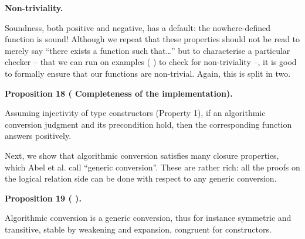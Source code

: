  
 
 
\par\medskip\noindent\textbf{Non-triviality.}\par
 
 
Soundness, both positive and negative, has a default: the nowhere-defined function is sound! Although we repeat that these properties should not be read to merely say “there exists a function such that…” but to characterise a particular checker – that we can run on examples ( ) to check for non-triviality –, it is good to formally ensure that our functions are non-trivial. Again, this is split in two.\par
 
 
 
\par\medskip\noindent\textbf{Proposition 18 (  Completeness of the implementation).}\par
 
 
Assuming injectivity of type constructors (Property 1), if an algorithmic conversion judgment and its precondition hold, then the corresponding function answers positively.\par
 
 
 
 
Next, we show that algorithmic conversion satisfies many closure properties, which Abel et al. call “generic conversion”. These are rather rich: all the proofs on the logical relation side can be done with respect to any generic conversion.\par
 
 
 
\par\medskip\noindent\textbf{Proposition 19 ( ).}\par
 
 
Algorithmic conversion is a generic conversion, thus for instance symmetric and transitive, stable by weakening and expansion, congruent for constructors.\par
 
